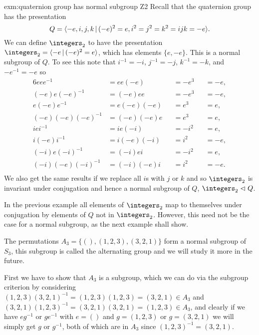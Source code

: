 \documentclass[fleqn]{NotesClass}
\newcommand*{\normalsubgroup}{\vartriangleleft}
\begin{document}
    \begin{exm}{}{exm:quaternion group has normal subgroup Z2}
        Recall that the quaternion group has the presentation
        \begin{equation}
            Q = \presentation{-e,i,j,k}{(-e)^2 = e, i^2 = j^2 = k^2 = ijk = -e}.
        \end{equation}
        We can define \(\integers_2\) to have the presentation \(\integers_2 = \presentation{-e}{(-e)^2 = e}\), which has elements \(\{e, -e\}\).
        This is a normal subgroup of \(Q\).
        To see this note that \(i^{-1} = -i\), \(j^{-1} = -j\), \(k^{-1} = -k\), and \(-e^{-1} = -e\) so
        \begin{alignat}{6}
            eee^{-1} &= ee(-e) &&= -e^3 &&= -e,\\
            (-e)e(-e)^{-1} &= (-e)ee &&= -e^3 &&= -e,\\
            e(-e)e^{-1} &= e(-e)(-e) &&= e^3 &&= e,\\
            (-e)(-e)(-e)^{-1} &= (-e)(-e)e &&= e^3 &&= e,\\ 
            iei^{-1} &= ie(-i) &&= -i^2 &&= e,\\
            i(-e)i^{-1} &= i(-e)(-i) &&= i^2 &&= -e,\\
            (-i)e(-i)^{-1} &= (-i)ei &&= -i^2 &&= e,\\
            (-i)(-e)(-i)^{-1} &= (-i)(-e)i &&= i^2 &&= -e.\\
        \end{alignat}
        We also get the same results if we replace all \(i\)s with \(j\) or \(k\) and so \(\integers_2\) is invariant under conjugation and hence a normal subgroup of \(Q\), \(\integers_2 \normalsubgroup Q\).
    \end{exm}
    
    In the previous example all elements of \(\integers_2\) map to themselves under conjugation by elements of \(Q\) not in \(\integers_2\).
    However, this need not be the case for a normal subgroup, as the next example shall show.
    
    \begin{exm}{}{}
        The permutations \(A_3 = \{(), (1, 2, 3), (3, 2, 1)\}\) form a normal subgroup of \(S_3\), this subgroup is called the alternating group and we will study it more in the future.
        
        First we have to show that \(A_3\) is a subgroup, which we can do via the subgroup criterion by considering \((1, 2, 3)(3, 2, 1)^{-1} = (1, 2, 3)(1, 2, 3) = (3, 2, 1) \in A_3\) and \((3, 2, 1)(1, 2, 3)^{-1} = (3, 2, 1)(3, 2, 1) = (1, 2, 3) \in A_3\), and clearly if we have \(eg^{-1}\) or \(ge^{-1}\) with \(e = ()\) and \(g = (1, 2, 3)\) or \(g = (3, 2, 1)\) we will simply get \(g\) or \(g^{-1}\), both of which are in \(A_3\) since \((1, 2, 3)^{-1} = (3, 2, 1)\).
    \end{exm}
\end{document}
